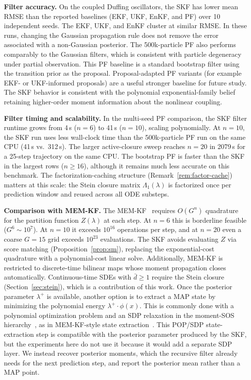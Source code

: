 \documentclass{article}
\theoremstyle{definition}
\begin{document}
\textbf{Filter accuracy.}
On the coupled Duffing oscillators, the SKF has lower mean RMSE than the
reported baselines (EKF, UKF, EnKF, and PF) over
10 independent seeds.
The EKF, UKF, and EnKF cluster at similar RMSE. In these runs, changing the
Gaussian propagation rule does not remove the error associated with a
non-Gaussian posterior.
The 500k-particle PF also performs comparably to the
Gaussian filters, which is consistent with particle degeneracy under partial
observation.
This PF baseline is a standard bootstrap filter using the transition prior
as the proposal. Proposal-adapted PF variants (for example EKF- or
UKF-informed proposals) are a useful stronger baseline for future study.
The SKF behavior is consistent with the polynomial exponential-family belief
retaining higher-order moment information about the nonlinear coupling.

\textbf{Filter timing and scalability.}
In the multi-seed PF comparison, the SKF filter runtime grows from
4\,s ($n{=}6$) to 41\,s ($n{=}10$), scaling polynomially.
At $n{=}10$, the SKF run uses less wall-clock time than the
500k-particle PF run on the
same CPU (41\,s vs.\ 312\,s).
The larger active-closure sweep reaches $n{=}20$ in 2079\,s for a
25-step trajectory on the same CPU.
The bootstrap PF is faster than the SKF in the largest rows
($n\ge 16$), although it remains much less accurate on this benchmark.
The factorization-caching structure (Remark~\ref{rem:factor-cache})
matters at this scale: the Stein closure matrix $\Lambda_1(\lambda)$ is
factorized once per prediction window and reused across all ODE substeps.

\textbf{Comparison with MEM-KF.}
The MEM-KF~\cite{teng2025} requires $O(G^n)$ quadrature for the
partition function $Z(\lambda)$ at each step.
At $n{=}6$ this is borderline feasible ($G^6 \sim 10^7$).
At $n{=}10$ it exceeds $10^{16}$ operations per step, and at
$n{=}20$ even a coarse $G=15$ grid exceeds $10^{23}$ evaluations.
The SKF avoids evaluating $Z$ via score matching
(Proposition~\ref{prop:sm}), replacing the exponential-cost
quadrature with a polynomial-cost linear solve.
Additionally, MEM-KF is restricted to discrete-time bilinear maps
whose moment propagation closes automatically.
Continuous-time SDEs with $\bar{d} \ge 1$ require the Stein closure
(Section~\ref{sec:stein}), which is a contribution of this work.
Once the posterior parameter $\lambda^+$ is available, another option
is to extract a MAP state by minimizing the polynomial energy
$\lambda^+\cdot\phi(x)$.
This is commonly done with a polynomial optimization problem and an SDP
relaxation in the moment-SOS
hierarchy~\cite{lasserre2001global,parrilo2003semidefinite}, as in
MEM-KF-style state extraction~\cite{teng2025}.
This POP/SDP state-extraction step is compatible with the posterior
parameter produced by the SKF, but the experiments here do not use it
because it would add a separate SDP layer.
We instead recover posterior moments, which the recursive filter already needs
for the next prediction step, and report the posterior mean rather than
a MAP point.
\end{document}
